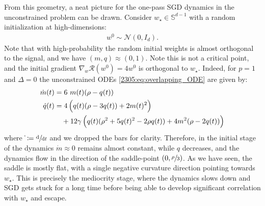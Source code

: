 From this geometry, a neat picture for the one-pass SGD dynamics in the unconstrained problem can be drawn. Consider $w_{\star}\in\mathbb{S}^{d-1}$ with a random initialization at high-dimensions:
\begin{align}
    w^{0}\sim\mathcal{N}(0,I_{d}).
\end{align}
Note that with high-probability the random initial weights is almost orthogonal to the signal, and we have $(m,q)\approx (0,1)$. Note this is not a critical point, and the initial gradient $\nabla_{w}\mathcal{R}(w^{0}) = 4 w^{0}$ is orthogonal to $w_{\star}$. Indeed, for $p=1$ and $\Delta=0$ the unconstrained ODEs \eqref{2305:eq:overlapping_ODE} are given by:
\begin{align}
\label{2305:eq:app:odes:highd}
\dot{m}(t) &= 6 ~m(t) (\rho-q(t))\\
\dot{q}(t) &= 4\left(q(t)(\rho-3q(t))+2m(t)^2\right) \notag\\
&\quad + 12\gamma\left(q(t)(\rho^2 + 5q(t)^2-2\rho q(t))+4m^2(\rho-2q(t))\right)
\end{align}
 where $\dot{} \coloneqq \sfrac{\text{d}}{\text{d} t}$ and we dropped the bars for clarity. Therefore, in the initial stage of the dynamics $\dot{m}\approx 0$ remains almost constant, while $q$ decreases, and the dynamics flow in the direction of the saddle-point $(0,\sfrac{\rho}{3})$. As we have seen, the saddle is mostly flat, with a single negative curvature direction pointing towards $w_{\star}$. This is precisely the mediocrity stage, where the dynamics slows down and SGD gets stuck for a long time before being able to develop significant correlation with $w_{\star}$ and escape.


